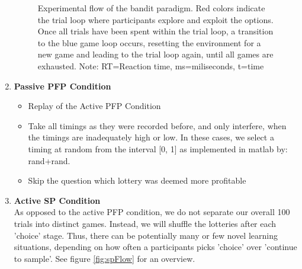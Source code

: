 \documentclass[
	12pt,
	oneside,
	bibliography=totocnumbered]{scrartcl}
\begin{document}
\begin{enumerate}
\begin{figure}[!ht]
\begin{center}
{
} %
\captionsetup{width=1\linewidth, format=plain}
\caption[Flow Bandit Paradigm]{Experimental flow of the bandit paradigm. Red colors indicate the trial loop where participants explore and exploit the options. Once all trials have been spent within the trial loop, a transition to the blue game loop occurs, resetting the environment for a new game and leading to the trial loop again, until all games are exhausted. Note: RT=Reaction time, ms=miliseconds, t=time}
\label{fig:banditFlow}
\end{center}
\end{figure}



\item \textbf{Passive PFP Condition} \\
\begin{itemize}
\item Replay of the Active PFP Condition
\item Take all timings as they were recorded before, and only interfere, when the timings are inadequately high or low. In these cases, we select a timing at random from the interval [0, 1] as implemented in matlab by: rand+rand.
\item Skip the question which lottery was deemed more profitable
\end{itemize} 


\item \textbf{Active SP Condition} \\
As opposed to the active PFP condition, we do not separate our overall 100 trials into distinct games. Instead, we will shuffle the lotteries after each 'choice' stage. Thus, there can be potentially many or few novel learning situations, depending on how often a participants picks 'choice' over 'continue to sample'. See figure \ref{fig:spFlow} for an overview.


\end{enumerate}
\end{document}
